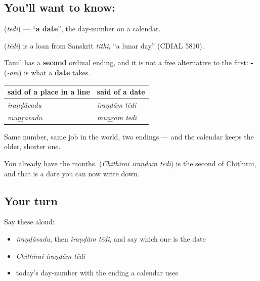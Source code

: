 \subsection*{You'll want to know: }
\textbf{} (\emph{tēdi}) — \textquotedblleft{}\textbf{a date}\textquotedblright{}, the day-number on a calendar.

\begin{cousinweb}
\textbf{} (\emph{tēdi}) is a loan from Sanskrit \emph{tithi}, \textquotedblleft{}a lunar day\textquotedblright{} (CDIAL 5810).
\end{cousinweb}

\begin{grammarlens}[title={Grammar Lens: a second ending, for one job}]
Tamil has a \textbf{second} ordinal ending, and it is not a free alternative to the first: \textbf{-} (\emph{-ām}) is what a \textbf{date} takes.

\noindent
\begin{tabularx}{\linewidth}{@{}>{\raggedright\arraybackslash}X>{\raggedright\arraybackslash}X@{}}
\toprule
\textbf{said of a place in a line} & \textbf{said of a date} \\
\midrule
\textbf{\ta{இரண்டாவது}} \emph{iraṇḍāvadu} & \textbf{\ta{இரண்டாம்} \ta{தேதி}} \emph{iraṇḍām tēdi} \\
\textbf{\ta{மூன்றாவது}} \emph{mūṉṟāvadu} & \textbf{\ta{மூன்றாம்} \ta{தேதி}} \emph{mūṉṟām tēdi} \\
\bottomrule
\end{tabularx}

Same number, same job in the world, two endings — and the calendar keeps the older, shorter one.

You already have the months. \textbf{  } (\emph{Chithirai iraṇḍām tēdi}) is the second of Chithirai, and that is a date you can now write down.
\end{grammarlens}

\subsection*{Your turn}
Say these aloud:

\begin{itemize}
\raggedright
  \item \emph{iraṇḍāvadu}, then \emph{iraṇḍām tēdi}, and say which one is the date
  \item \emph{Chithirai iraṇḍām tēdi}
  \item today's day-number with the ending a calendar uses
\end{itemize}

